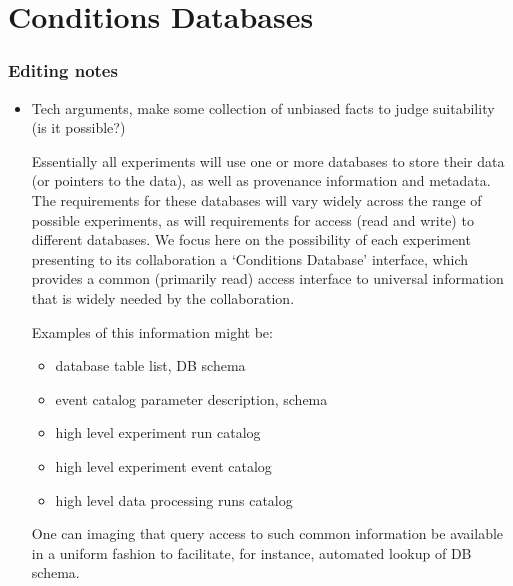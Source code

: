 \section{Conditions Databases}


\subsubsection{Editing notes}




\begin{itemize}
\item Tech arguments, make some collection of unbiased facts to judge suitability (is it possible?)

	Essentially all experiments will use one or more databases to
	store their data (or pointers to the data), as well as provenance 
	information and metadata.  The requirements for these databases will
	vary widely across the range of possible experiments, as will
	requirements for access (read and write) to different databases.  
	We focus here on the possibility of each experiment presenting
	to its collaboration a `Conditions Database' interface, which
	provides a common (primarily read) access interface to universal
	information that is widely needed by the collaboration.

	Examples of this information might be:
	\begin{itemize}
	\item database table list, DB schema
	\item event catalog parameter description, schema
	\item high level experiment run catalog
	\item high level experiment event catalog
	\item high level data processing runs catalog
	\end{itemize}

	One can imaging that query access to such common information be
	available in a uniform fashion to facilitate, for instance,
	automated lookup of DB schema.  


\end{itemize}

